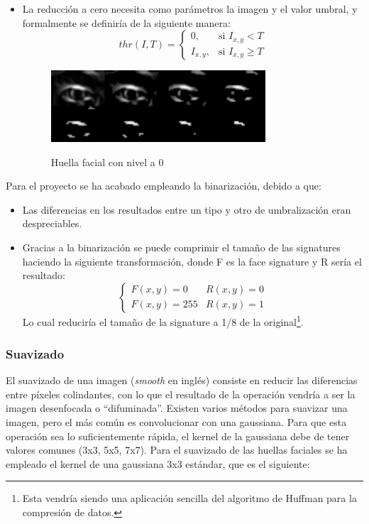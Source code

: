 \begin{itemize}
	\item{La reducción a cero necesita como parámetros la imagen y el valor umbral, y formalmente se definiría de la siguiente manera:}
	\[
		thr(I,T) = \begin{cases}
				0, & \text{si $I_{x,y} < T$}\\
				I_{x,y}, & \text{si $I_{x,y} \geq T$}
			\end{cases}
	\]

	\begin{figure}[h!]
		\centering
		\includegraphics[width=8cm]{imagenes/umbral_tozero.png}\\
		\caption{Huella facial con nivel a 0}
		\label{fig:thr_tozero}
	\end{figure}

\end{itemize}

Para el proyecto se ha acabado empleando la binarización, debido a que:
\begin{itemize}
\item {Las diferencias en los resultados entre un tipo y otro de umbralización eran despreciables.}
\item {Gracias a la binarización se puede comprimir el tamaño de las signatures haciendo la siguiente transformación, donde F es la face signature y R sería el resultado:
\[
 \begin{cases}
	F(x,y)=0 & R(x,y)=0 \\
	F(x,y)=255 & R(x,y)=1
 \end{cases}
\]
Lo cual reduciría el tamaño de la signature a 1/8 de la original\footnote{Esta vendría siendo una aplicación sencilla del algoritmo de Huffman para la compresión de datos.}. }
\end{itemize}


\subsubsection{Suavizado}
El suavizado de una imagen (\textit{smooth} en inglés) consiste en reducir las diferencias entre píxeles colindantes, con lo que el resultado de la operación vendría a ser la imagen desenfocada o ``difuminada''. Existen varios métodos para suavizar una imagen, pero el más común es convolucionar con una gaussiana. Para que esta operación sea lo suficientemente rápida, el kernel de la gaussiana debe de tener valores comunes (3x3, 5x5, 7x7).
Para el suavizado de las huellas faciales se ha empleado el kernel de una gaussiana 3x3 estándar, que es el siguiente:

